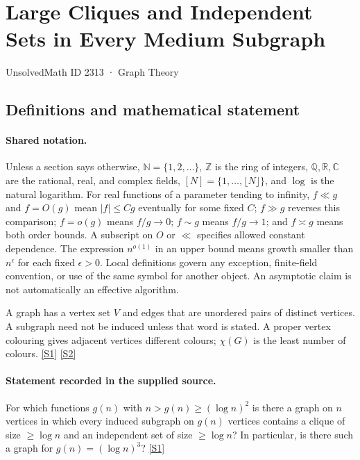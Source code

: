 \documentclass[11pt,a4paper]{article}
\newcommand{\N}{\mathbb{N}}
\newcommand{\Z}{\mathbb{Z}}
\newcommand{\Q}{\mathbb{Q}}
\newcommand{\R}{\mathbb{R}}
\newcommand{\C}{\mathbb{C}}
\newcommand{\sref}[2]{\hyperlink{source:#1:#2}{[S#2]}}
\begin{document}

\setcounter{section}{2312}

\section{Large Cliques and Independent Sets in Every Medium Subgraph}\label{2313}

{\small\sffamily UnsolvedMath ID 2313 · Graph Theory}

\subsection{Definitions and mathematical statement}

\paragraph{Shared notation.}Unless a section says otherwise, $\N=\{1,2,\ldots\}$,
$\Z$ is the ring of integers, $\Q,\R,\C$ are the rational, real, and complex
fields, $[N]=\{1,\ldots,\lfloor N\rfloor\}$, and $\log$ is the natural
logarithm. For real functions of a parameter tending to infinity,
$f\ll g$ and $f=O(g)$ mean $|f|\leq Cg$ eventually for some fixed $C$;
$f\gg g$ reverses this comparison; $f=o(g)$ means $f/g\to0$;
$f\sim g$ means $f/g\to1$; and $f\asymp g$ means both order bounds.
A subscript on $O$ or $\ll$ specifies allowed constant dependence.
The expression $n^{o(1)}$ in an upper bound means growth smaller than
$n^\epsilon$ for each fixed $\epsilon>0$. Local definitions govern any
exception, finite-field convention, or use of the same symbol for another
object. An asymptotic claim is not automatically an effective algorithm.



A graph has a vertex set $V$ and edges that are unordered pairs of distinct vertices. A subgraph need not be induced unless that word is stated. A proper vertex colouring gives adjacent vertices different colours; $\chi(G)$ is the least number of colours. \sref{2313}{1} \sref{2313}{2}

\paragraph{Statement recorded in the supplied source.}
For which functions $g(n)$ with $n>g(n)\geq (\log n)^2$ is there a graph on $n$ vertices in which every induced subgraph on $g(n)$ vertices contains a clique of size $\geq \log n$ and an independent set of size $\geq \log n$?
In particular, is there such a graph for $g(n)=(\log n)^3$? \sref{2313}{1}
\end{document}
